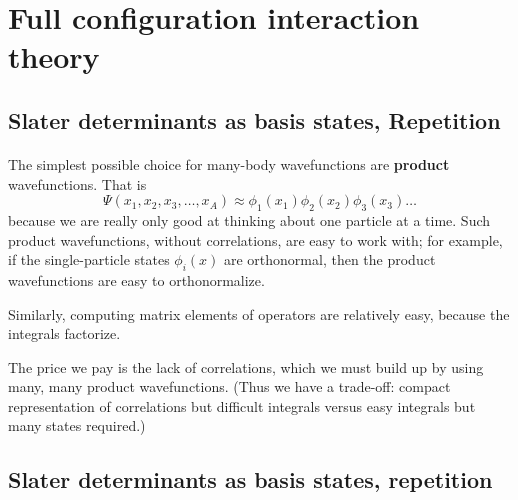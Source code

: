 \documentclass[%
oneside,                 %
final,                   %
10pt]{article}
\begin{document}

\newcommand{\exercisesection}[1]{\subsection*{#1}}



\section*{Full configuration interaction theory}

\subsection*{Slater determinants as basis states, Repetition}

\paragraph{}
The simplest possible choice for many-body wavefunctions are \textbf{product} wavefunctions.
That is
\[ 
\Psi(x_1, x_2, x_3, \ldots, x_A) \approx \phi_1(x_1) \phi_2(x_2) \phi_3(x_3) \ldots
\]
because we are really only good  at thinking about one particle at a time. Such 
product wavefunctions, without correlations, are easy to 
work with; for example, if the single-particle states $\phi_i(x)$ are orthonormal, then 
the product wavefunctions are easy to orthonormalize.   

Similarly, computing matrix elements of operators are relatively easy, because the 
integrals factorize.

The price we pay is the lack of correlations, which we must build up by using many, many product 
wavefunctions. (Thus we have a trade-off: compact representation of correlations but 
difficult integrals versus easy integrals but many states required.)



\subsection*{Slater determinants as basis states, repetition}

\end{document}
